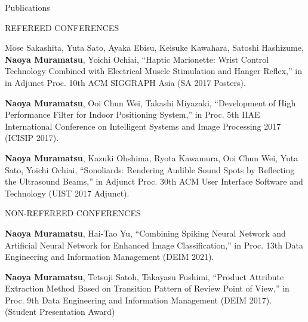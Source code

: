 \documentclass{resume} %
\begin{document}
\begin{rSection}{Publications}
\begin{rSubsection}{REFEREED CONFERENCES}{}{}{}{}
        \item Mose Sakashita, Yuta Sato, Ayaka Ebisu, Keisuke Kawahara, Satoshi Hashizume, \textbf{Naoya Muramatsu}, Yoichi Ochiai, ``Haptic Marionette: Wrist Control Technology Combined with Electrical Muscle Stimulation and Hanger Reflex,'' in in Adjunct Proc. 10th ACM SIGGRAPH Asia (SA 2017 Posters).
        \item \textbf{Naoya Muramatsu}, Ooi Chun Wei, Takashi Miyazaki, ``Development of High Performance Filter for Indoor Positioning System,'' in Proc. 5th IIAE International Conference on Intelligent Systems and Image Processing 2017 (ICISIP 2017).
        \item \textbf{Naoya Muramatsu}, Kazuki Ohshima, Ryota Kawamura, Ooi Chun Wei, Yuta Sato, Yoichi Ochiai, ``Sonoliards: Rendering Audible Sound Spots by Reflecting the Ultrasound Beams,'' in Adjunct Proc. 30th ACM User Interface Software and Technology (UIST 2017 Adjunct).
    \end{rSubsection}




    \begin{rSubsection}{NON-REFEREED CONFERENCES}{}{}{}{}
        \item \textbf{Naoya Muramatsu}, Hai-Tao Yu, ``Combining Spiking Neural Network and Artificial Neural Network for Enhanced Image Classification,'' in Proc. 13th Data Engineering and Information Management (DEIM 2021).
        \item \textbf{Naoya Muramatsu}, Tetsuji Satoh, Takayasu Fushimi, ``Product Attribute Extraction Method Based on Transition Pattern of Review Point of View,'' in Proc. 9th Data Engineering and Information Management (DEIM 2017). (Student Presentation Award) %
    \end{rSubsection}

\end{rSection}
\end{document}
